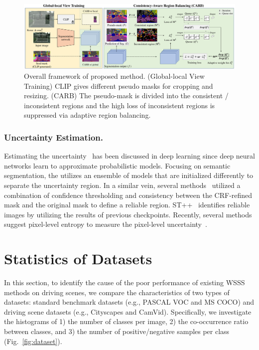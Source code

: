 \documentclass[letterpaper]{article} %
\def\eg{e.g.} \def\Eg{E.g.}
\begin{document}
\begin{figure}[t!]
\centering
\includegraphics[width=17cm]{figures/fig_framework.pdf}
\caption{Overall framework of proposed method. (Global-local View Training) CLIP gives different pseudo masks for cropping and resizing. (CARB) The pseudo-mask is divided into the consistent / inconsistent regions and the high loss of inconsistent regions is suppressed via adaptive region balancing.}
\label{fig:framework}
\end{figure}

\subsubsection{Uncertainty Estimation.} Estimating the uncertainty~\cite{DBLP:conf/nips/KendallG17} has been discussed in deep learning since deep neural networks learn to approximate probabilistic models. Focusing on semantic segmentation, the \citeauthor{feng2022dmt} utilizes an ensemble of models that are initialized differently to separate the uncertainty region. In a similar vein, several methods~\cite{oh2021background,DBLP:conf/aaai/ZhangXWSH20} utilized a combination of confidence thresholding and consistency between the CRF-refined mask and the original mask to define a reliable region. ST++~\cite{yang2022st++} identifies reliable images by utilizing the results of previous checkpoints. Recently, several methods suggest pixel-level entropy to measure the pixel-level uncertainty~\cite{NEURIPS2020_f73b76ce,Huynh:CVPR22,li2022uncertainty, wang2022semi}.

\section{Statistics of Datasets}
In this section, to identify the cause of the poor performance of existing WSSS methods on driving scenes, we compare the characteristics of two types of datasets: standard benchmark datasets (\eg, PASCAL VOC and MS COCO) and driving scene datasets (\eg, Cityscapes and CamVid). Specifically, we investigate the histograms of 1) the number of classes per image, 2) the co-occurrence ratio between classes, and 3) the number of positive/negative samples per class (Fig.~\ref{fig:dataset}).
\end{document}
